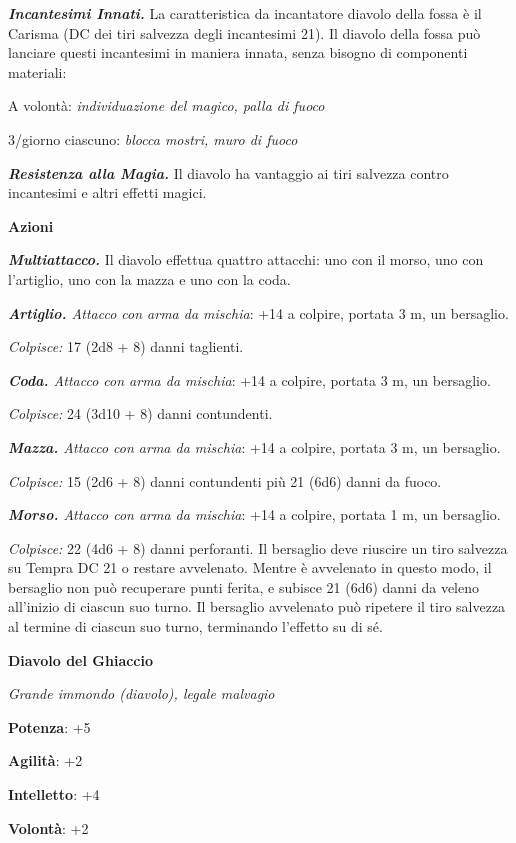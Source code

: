 \begin{multicols}{2}
\emph{\textbf{Incantesimi Innati.}} La caratteristica da incantatore
diavolo della fossa è il Carisma (DC dei tiri salvezza degli incantesimi
21). Il diavolo della fossa può lanciare questi incantesimi in maniera
innata, senza bisogno di componenti materiali:

A volontà: \emph{individuazione del magico, palla di fuoco}

3/giorno ciascuno: \emph{blocca mostri, muro di fuoco}

\emph{\textbf{Resistenza alla Magia.}} Il diavolo ha vantaggio ai tiri
salvezza contro incantesimi e altri effetti magici.

\smallskip\textbf{Azioni}

\emph{\textbf{Multiattacco.}} Il diavolo effettua quattro attacchi: uno
con il morso, uno con l'artiglio, uno con la mazza e uno con la coda.

\emph{\textbf{Artiglio.} Attacco con arma da mischia}: +14 a colpire,
portata 3 m, un bersaglio.

\emph{Colpisce:} 17 (2d8 + 8) danni taglienti.

\emph{\textbf{Coda.} Attacco con arma da mischia}: +14 a colpire,
portata 3 m, un bersaglio.

\emph{Colpisce:} 24 (3d10 + 8) danni contundenti.

\emph{\textbf{Mazza.} Attacco con arma da mischia}: +14 a colpire,
portata 3 m, un bersaglio.

\emph{Colpisce:} 15 (2d6 + 8) danni contundenti più 21 (6d6) danni da
fuoco.

\emph{\textbf{Morso.} Attacco con arma da mischia}: +14 a colpire,
portata 1 m, un bersaglio.

\emph{Colpisce:} 22 (4d6 + 8) danni perforanti. Il bersaglio deve
riuscire un tiro salvezza su Tempra DC 21 o restare avvelenato.
Mentre è avvelenato in questo modo, il bersaglio non può recuperare
punti ferita, e subisce 21 (6d6) danni da veleno all'inizio di ciascun
suo turno. Il bersaglio avvelenato può ripetere il tiro salvezza al
termine di ciascun suo turno, terminando l'effetto su di sé.

\textbf{Diavolo del Ghiaccio}

\emph{Grande immondo (diavolo), legale malvagio}

\textbf{Potenza}: +5

\textbf{Agilità}: +2

\textbf{Intelletto}: +4

\textbf{Volontà}: +2


\end{multicols}
